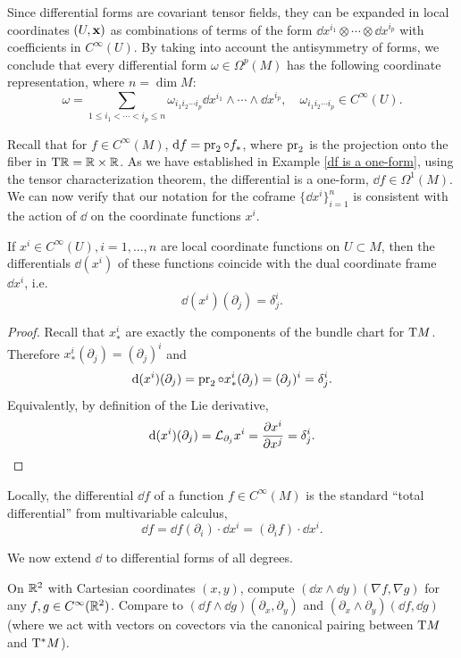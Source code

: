 \begin{rem}
    Since differential forms are covariant tensor fields, they can be expanded in local coordinates $(U,\bf{x})$ as combinations of terms of the form $\dd x^{i_1}\otimes\cdots\otimes \dd x^{i_p}$ with coefficients in $C^\infty(U)$. By taking into account the antisymmetry of forms, we conclude that every differential form $\omega\in\Omega^p(M)$ has the following coordinate representation, where $n=\dim M$:
    \[\omega=\sum_{1\leq i_1<\cdots <i_p\leq n}\omega_{i_1 i_2\cdots i_p}\dd x^{i_1}\wedge\cdots\wedge \dd x^{i_p},\quad \omega_{i_1 i_2\cdots i_p}\in C^\infty(U).\label{eq local rep of a p-form}\]
\end{rem}


Recall that for $f\in C^\infty(M)$, $\dd f=\pr_2\circ f_\ast$, where $\pr_2$ is the projection onto the fiber in $\T\bbR =\bbR \times\bbR $. As we have established in Example \ref{df is a one-form}, using the tensor characterization theorem, the differential is a one-form, $\dd f\in\Omega^1(M)$. We can now verify that our notation for the coframe $\{\dd x^i\}_{i=1}^n$ is consistent with the action of $\dd$ on the coordinate functions $x^i$.

\begin{prop}
    If $x^i\in C^\infty(U),i=1,\ldots,n$ are local coordinate functions on $U\subset M$, then the differentials $\dd (x^i)$ of these functions coincide with the dual coordinate frame $\dd x^i$, i.e.
    \[\dd (x^i)(\partial_j)=\delta^i_j.\]
\end{prop}
\begin{proof}
    Recall that $x^i_\ast$ are exactly the components of the bundle chart for $\T M$. Therefore $x^i_\ast(\partial_j)=(\partial_j)^i$ and
    \[\dd (x^i)(\partial_{j})=\pr_2\circ x^i_\ast (\partial_{j})=(\partial_j)^i=\delta^i_j.\]
    Equivalently, by definition of the Lie derivative, 
    \[\dd (x^i)(\partial_j)=\Lie_{\partial_j}x^i=\frac{\partial x^i}{\partial x^j}=\delta^i_j.\]
\end{proof}
\begin{cor}
    Locally, the differential $\dd f$ of a function $f\in C^\infty(M)$ is the standard ``total differential'' from multivariable calculus, \[\dd f=\dd f(\partial_i)\cdot\dd x^i=(\partial_i f)\cdot \dd x^i.\]
\end{cor}

We now extend $\dd$ to differential forms of all degrees.

\begin{xca}
    On $\bbR^2$ with Cartesian coordinates $(x,y)$, compute $(\dd x\wedge \dd y)(\nabla f,\nabla g)$ for any $f,g\in C^\infty(\bbR^2)$. Compare to $(\dd f\wedge \dd g)(\partial_x,\partial_y)$ and $(\partial_x\wedge\partial_y)(\dd f,\dd g)$ (where we act with vectors on covectors via the canonical pairing between $\T M$ and $\T^\ast M$).
\end{xca}

